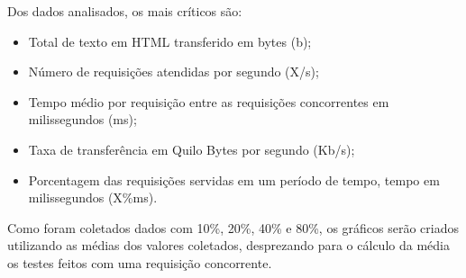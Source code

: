 Dos dados analisados, os mais críticos são:

\begin{itemize}
	\item Total de texto em HTML transferido em bytes (b);
	\item Número de requisições atendidas por segundo (X/s);
	\item Tempo médio por requisição entre as requisições concorrentes em 
	milissegundos (ms);
	\item Taxa de transferência em Quilo Bytes por segundo (Kb/s);
	\item Porcentagem das requisições servidas em um período de tempo, tempo em milissegundos (X\%ms).
\end{itemize}

Como foram coletados dados com 10\%, 20\%, 40\% e 80\%, os gráficos serão 
criados utilizando as médias dos valores coletados, desprezando para o cálculo 
da média os testes feitos com uma requisição concorrente.


